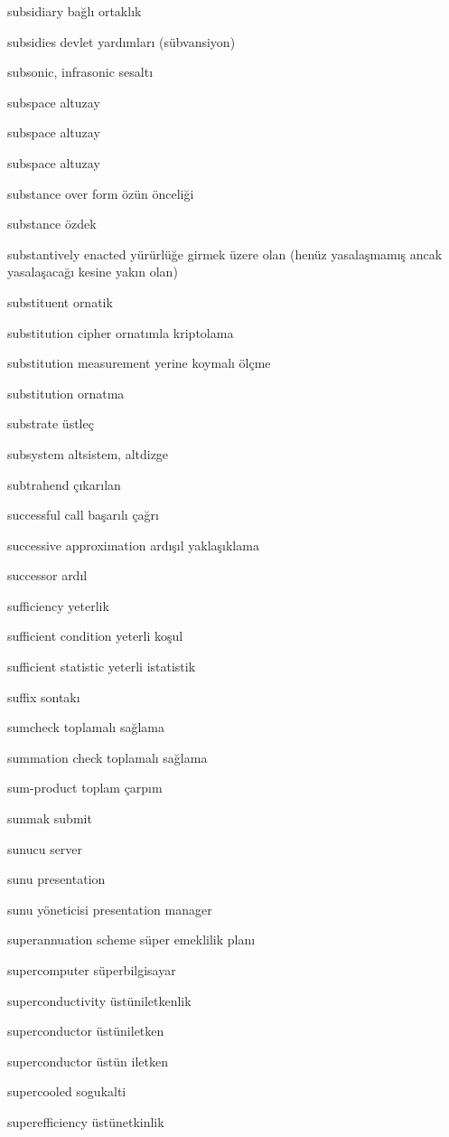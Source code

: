 \documentclass[12pt,fleqn]{article}\usepackage{../../common}
\begin{document}
subsidiary bağlı ortaklık

subsidies devlet yardımları (sübvansiyon)

subsonic, infrasonic sesaltı

subspace altuzay

subspace altuzay

subspace altuzay

substance over form özün önceliği

substance özdek

substantively enacted yürürlüğe girmek üzere olan (henüz yasalaşmamış ancak yasalaşacağı kesine yakın olan)

substituent ornatik

substitution cipher ornatımla kriptolama

substitution measurement yerine koymalı ölçme

substitution ornatma

substrate üstleç

subsystem altsistem, altdizge

subtrahend çıkarılan

successful call başarılı çağrı

successive approximation ardışıl yaklaşıklama

successor ardıl

sufficiency yeterlik

sufficient condition yeterli koşul

sufficient statistic yeterli istatistik

suffix sontakı

sumcheck toplamalı sağlama

summation check toplamalı sağlama

sum-product toplam çarpım

sunmak submit

sunucu server

sunu presentation

sunu yöneticisi presentation manager

superannuation scheme süper emeklilik planı

supercomputer süperbilgisayar

superconductivity üstüniletkenlik

superconductor üstüniletken

superconductor üstün iletken

supercooled sogukalti

superefficiency üstünetkinlik
\end{document}
